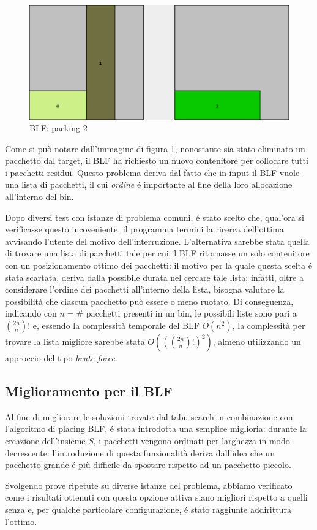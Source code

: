 \begin{figure}[htb]
  \centering
  \includegraphics[height=0.3\textwidth]{./img/inconv2.png}
  \caption{BLF: packing 2}
  \label{img:inconv2}
\end{figure}

Come si può notare dall'immagine di figura \ref{img:inconv2}, nonostante sia stato eliminato un pacchetto dal target, il BLF ha richiesto un nuovo contenitore per collocare tutti i pacchetti residui. Questo problema deriva dal fatto che in input il BLF vuole una lista di pacchetti, il cui \textit{ordine} é importante al fine della loro allocazione all'interno del bin.

Dopo diversi test con istanze di problema comuni, é stato scelto che, qual'ora si verificasse questo incoveniente, il programma termini la ricerca dell'ottima avvisando l'utente del motivo dell'interruzione. L'alternativa sarebbe stata quella di trovare una lista di pacchetti tale per cui il BLF ritornasse un solo contenitore con un posizionamento ottimo dei pacchetti: il motivo per la quale questa scelta é stata scartata, deriva dalla possibile durata nel cercare tale lista; infatti, oltre a considerare l'ordine dei pacchetti all'interno della lista, bisogna valutare la possibilità che ciascun pacchetto può essere o meno ruotato. Di conseguenza, indicando con $n = \#$ pacchetti presenti in un bin, le possibili liste sono pari a $\binom{2n}{n}!$ e, essendo la complessità temporale del BLF $O(n^2)$, la complessità per trovare la lista migliore sarebbe stata $O\left((\binom{2n}{n}!)^2\right)$, almeno utilizzando un approccio del tipo \textit{brute force}.

\subsection{Miglioramento per il BLF}
Al fine di migliorare le soluzioni trovate dal tabu search in combinazione con l'algoritmo di placing BLF, é stata introdotta una semplice miglioria: durante la creazione dell'insieme $S$, i pacchetti vengono ordinati per larghezza in modo decrescente: l'introduzione di questa funzionalità deriva dall'idea che un pacchetto grande é più difficile da spostare rispetto ad un pacchetto piccolo.

Svolgendo prove ripetute su diverse istanze del problema, abbiamo verificato come i risultati ottenuti con questa opzione attiva siano migliori rispetto a quelli senza e, per qualche particolare configurazione, é stato raggiunte addirittura l'ottimo.
